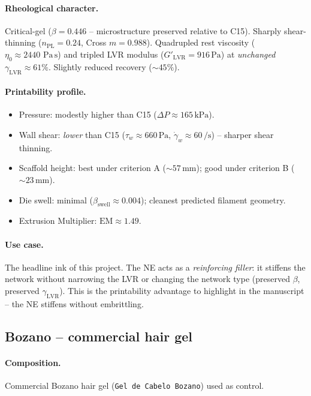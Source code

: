 \documentclass[11pt,a4paper]{article}
\newcommand{\gd}{\dot{\gamma}}
\newcommand{\Pas}{\,\mathrm{Pa\,s}}
\begin{document}
\paragraph{Rheological character.} Critical-gel ($\beta=0.446$ --
microstructure preserved relative to C15). Sharply shear-thinning
($n_\mathrm{PL}=0.24$, Cross $m=0.988$). Quadrupled rest viscosity
($\eta_0\approx 2440\,\Pas$) and tripled LVR modulus
($G'_\mathrm{LVR}=916\,\si{\Pa}$) at \emph{unchanged}
$\gamma_\mathrm{LVR}\approx 61\%$. Slightly reduced recovery ($\sim 45\%$).

\paragraph{Printability profile.}
\begin{itemize}[leftmargin=1.4em,itemsep=2pt]
\item Pressure: modestly higher than C15 ($\Delta P\approx 165\,\si{\kPa}$).
\item Wall shear: \emph{lower} than C15 ($\tau_w\approx 660\,\si{\Pa}$,
  $\gd_w\approx 60\,\si{\per\s}$) -- sharper shear thinning.
\item Scaffold height: best under criterion A ($\sim 57\,\si{\mm}$);
  good under criterion B ($\sim 23\,\si{\mm}$).
\item Die swell: minimal ($\beta_\mathrm{swell}\approx 0.004$);
  cleanest predicted filament geometry.
\item Extrusion Multiplier: $\mathrm{EM}\approx 1.49$.
\end{itemize}

\paragraph{Use case.} The headline ink of this project. The NE acts
as a \emph{reinforcing filler}: it stiffens the network without
narrowing the LVR or changing the network type (preserved $\beta$,
preserved $\gamma_\mathrm{LVR}$). This is the printability advantage
to highlight in the manuscript -- the NE stiffens without embrittling.

\subsection{Bozano -- commercial hair gel}

\paragraph{Composition.} Commercial Bozano hair gel
(\texttt{Gel de Cabelo Bozano}) used as control.
\end{document}
